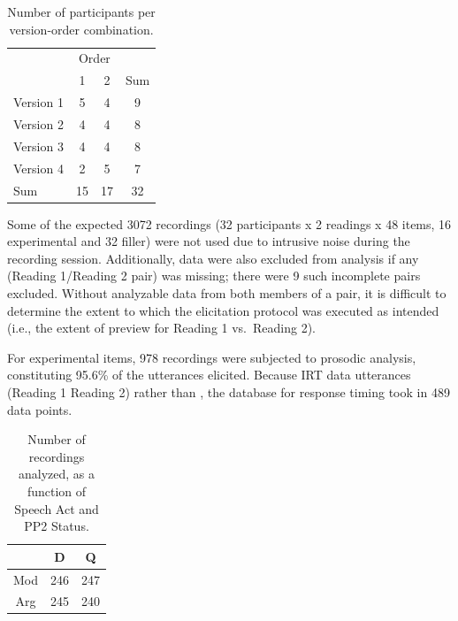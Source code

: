 \documentclass[12pt,oneside]{book}
\begin{document}
\begin{table}[!h]

\caption{\label{tab:vtab}Number of participants per version-order combination.}
\centering
\begin{tabular}{lccc}
\toprule
\multicolumn{1}{c}{ } & \multicolumn{2}{c}{Order} & \multicolumn{1}{c}{ } \\
\cmidrule(l{3pt}r{3pt}){2-3}
  & 1 & 2 & Sum\\
\midrule
Version 1 & 5 & 4 & 9\\
Version 2 & 4 & 4 & 8\\
Version 3 & 4 & 4 & 8\\
Version 4 & 2 & 5 & 7\\
Sum & 15 & 17 & 32\\
\bottomrule
\end{tabular}
\end{table}

Some of the expected 3072 recordings (32 participants x 2 readings x 48 items, 16 experimental and 32 filler) were not used due to intrusive noise during the recording session. Additionally, data were also excluded from analysis if any (Reading 1/Reading 2 pair) was missing; there were 9 such incomplete pairs excluded. Without analyzable data from both members of a pair, it is difficult to determine the extent to which the elicitation protocol was executed as intended (i.e., the extent of preview for Reading 1 vs.~Reading 2).

For experimental items, 978 recordings were subjected to prosodic analysis, constituting 95.6\% of the utterances elicited. Because IRT data  utterances  (Reading 1  Reading 2) rather than , the database for response timing took in 489 data points.

\begin{table}[!h]

\caption{\label{tab:rvtab}Number of recordings analyzed, as a function of Speech Act and PP2 Status.}
\centering
\begin{tabular}{ccc}
\toprule
  & D & Q\\
\midrule
Mod & 246 & 247\\
Arg & 245 & 240\\
\bottomrule
\end{tabular}
\end{table}
\end{document}
